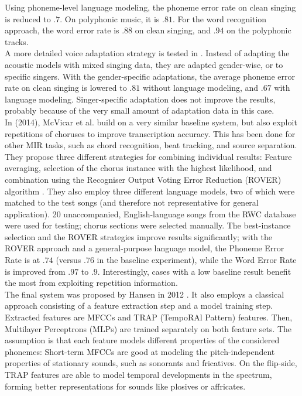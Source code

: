 Using phoneme-level language modeling, the phoneme error rate on clean singing is reduced to $.7$. On polyphonic music, it is $.81$. For the word recognition approach, the word error rate is $.88$ on clean singing, and $.94$ on the polyphonic tracks.\\
A more detailed voice adaptation strategy is tested in \cite{Mesaros2010a}. Instead of adapting the acoustic models with mixed singing data, they are adapted gender-wise, or to specific singers. With the gender-specific adaptations, the average phoneme error rate on clean singing is lowered to $.81$ without language modeling, and $.67$ with language modeling. Singer-specific adaptation does not improve the results, probably because of the very small amount of adaptation data in this case.\\
In \cite{mcvicar_repetition} (2014), McVicar et al. build on a very similar baseline system, but also exploit repetitions of choruses to improve transcription accuracy. This has been done for other MIR tasks, such as chord recognition, beat tracking, and source separation. They propose three different strategies for combining individual results: Feature averaging, selection of the chorus instance with the highest likelihood, and combination using the Recogniser Output Voting Error Reduction (ROVER) algorithm \cite{rover}. They also employ three different language models, two of which were matched to the test songs (and therefore not representative for general application). 20 unaccompanied, English-language songs from the RWC database \cite{rwc} were used for testing; chorus sections were selected manually. The best-instance selection and the ROVER strategies improve results significantly; with the ROVER approach and a general-purpose language model, the Phoneme Error Rate is at $.74$ (versus $.76$ in the baseline experiment), while the Word Error Rate is improved from $.97$ to $.9$. Interestingly, cases with a low baseline result benefit the most from exploiting repetition information.\\
\medskip
The final system was proposed by Hansen in 2012 \cite{jens}. It also employs a classical approach consisting of a feature extraction step and a model training step. Extracted features are MFCCs and TRAP (TempoRAl Pattern) features. Then, Multilayer Perceptrons (MLPs) are trained separately on both feature sets. The assumption is that each feature models different properties of the considered phonemes: Short-term MFCCs are good at modeling the pitch-independent properties of stationary sounds, such as sonorants and fricatives. On the flip-side, TRAP features are able to model temporal developments in the spectrum, forming better representations for sounds like plosives or affricates.\\
